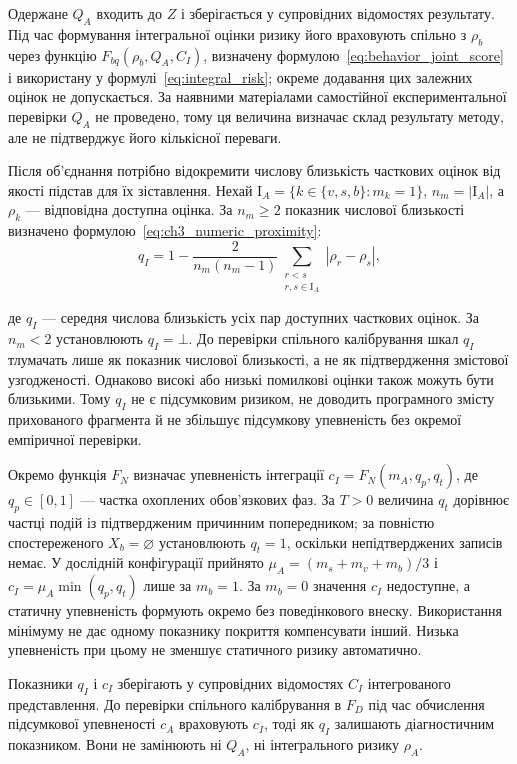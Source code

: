 Одержане $Q_A$ входить до $Z$ і зберігається у супровідних відомостях результату. Під час формування інтегральної оцінки ризику його враховують спільно з $\rho_b$ через функцію $F_{bq}(\rho_b,Q_A,C_I)$, визначену формулою~\eqref{eq:behavior_joint_score} і використану у формулі~\eqref{eq:integral_risk}; окреме додавання цих залежних оцінок не допускається. За наявними матеріалами самостійної експериментальної перевірки $Q_A$ не проведено, тому ця величина визначає склад результату методу, але не підтверджує його кількісної переваги.

Після об’єднання потрібно відокремити числову близькість часткових оцінок від якості підстав для їх зіставлення. Нехай $\mathrm I_A=\{k\in\{v,s,b\}:m_k=1\}$, $n_m=|\mathrm I_A|$, а $\rho_k$ --- відповідна доступна оцінка. За $n_m\geq2$ показник числової близькості визначено формулою~\eqref{eq:ch3_numeric_proximity}:
\begin{equation}
q_I=
1-\frac{2}{n_m(n_m-1)}
\sum_{\substack{r<s\\r,s\in\mathrm I_A}}
|\rho_r-\rho_s|,
\label{eq:ch3_numeric_proximity}
\end{equation}

де $q_I$ --- середня числова близькість усіх пар доступних часткових оцінок. За $n_m<2$ установлюють $q_I=\bot$. До перевірки спільного калібрування шкал $q_I$ тлумачать лише як показник числової близькості, а не як підтвердження змістової узгодженості. Однаково високі або низькі помилкові оцінки також можуть бути близькими. Тому $q_I$ не є підсумковим ризиком, не доводить програмного змісту прихованого фрагмента й не збільшує підсумкову упевненість без окремої емпіричної перевірки.

Окремо функція $F_N$ визначає упевненість інтеграції $c_I=F_N(m_A,q_p,q_t)$, де $q_p\in[0,1]$ --- частка охоплених обов’язкових фаз. За $T>0$ величина $q_t$ дорівнює частці подій із підтвердженим причинним попередником; за повністю спостереженого $X_b=\varnothing$ установлюють $q_t=1$, оскільки непідтверджених записів немає. У дослідній конфігурації прийнято $\mu_A=(m_s+m_v+m_b)/3$ і $c_I=\mu_A\min(q_p,q_t)$ лише за $m_b=1$. За $m_b=0$ значення $c_I$ недоступне, а статичну упевненість формують окремо без поведінкового внеску. Використання мінімуму не дає одному показнику покриття компенсувати інший. Низька упевненість при цьому не зменшує статичного ризику автоматично.

Показники $q_I$ і $c_I$ зберігають у супровідних відомостях $C_I$ інтегрованого представлення. До перевірки спільного калібрування в $F_D$ під час обчислення підсумкової упевненості $c_A$ враховують $c_I$, тоді як $q_I$ залишають діагностичним показником. Вони не замінюють ні $Q_A$, ні інтегрального ризику $\rho_A$.

